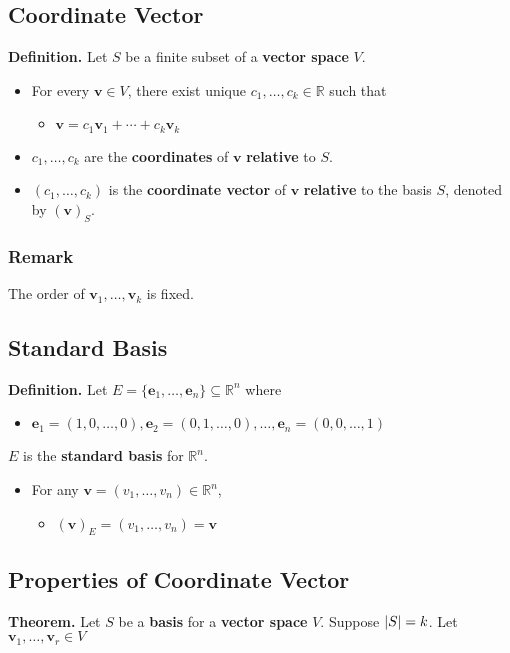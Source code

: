 \documentclass[../ma2001_notes.tex]{subfiles}
\begin{document}
\subsection{Coordinate Vector}
\textbf{Definition.} Let \(S\) be a finite subset of a \textbf{vector space} \(V\).
\begin{itemize}
	\item For every \(\bm{v}\in V\), there exist unique \(c_1,\ldots,c_k\in\mathbb{R}\) such that
	\begin{itemize}
		\item\(\bm{v}=c_1\bm{v}_1+\cdots+c_k\bm{v}_k\)
	\end{itemize}
	\item\(c_1,\ldots,c_k\) are the \textbf{coordinates} of \(\bm{v}\) \textbf{relative} to \(S\).
	\item\((c_1,\ldots,c_k)\) is the \textbf{coordinate vector} of \(\bm{v}\) \textbf{relative} to the basis \(S\), denoted by \((\bm{v})_S\).
\end{itemize}

\subsubsection{Remark}
The order of \(\bm{v}_1,\ldots,\bm{v}_k\) is fixed.

\subsection{Standard Basis}
\textbf{Definition.} Let \(E=\{\bm{e}_1,\ldots,\bm{e}_n\}\subseteq\mathbb{R}^n\) where
\begin{itemize}
	\item\(\bm{e}_1=(1,0,\ldots,0),\bm{e}_2=(0,1,\ldots,0),\ldots,\bm{e}_n=(0,0,\ldots,1)\)
\end{itemize}
\(E\) is the \textbf{standard basis} for \(\mathbb{R}^n\).
\begin{itemize}
	\item For any \(\bm{v}=(v_1,\ldots,v_n)\in\mathbb{R}^n\),
	\begin{itemize}
		\item\((\bm{v})_E=(v_1,\ldots,v_n)=\bm{v}\)
	\end{itemize}
\end{itemize}

\subsection{Properties of Coordinate Vector}
\textbf{Theorem.} Let \(S\) be a \textbf{basis} for a \textbf{vector space} \(V\). Suppose \(\lvert S\rvert=k\). Let \(\bm{v}_1,\ldots,\bm{v}_r\in V\)
\end{document}
